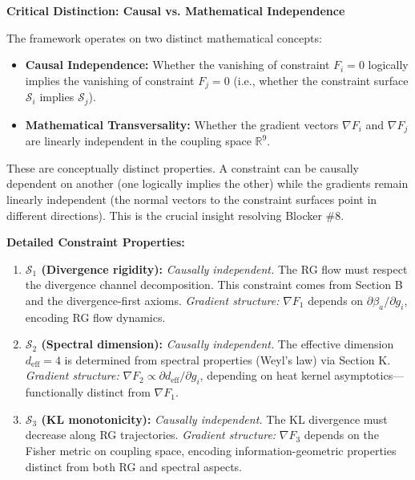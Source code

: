 {\begin{remark}
\textbf{Critical Distinction: Causal vs. Mathematical Independence}

The framework operates on two distinct mathematical concepts:

\begin{itemize}
\item \textbf{Causal Independence:} Whether the vanishing of constraint $F_i = 0$ logically implies the vanishing of constraint $F_j = 0$ (i.e., whether the constraint surface $\mathcal{S}_i$ implies $\mathcal{S}_j$).
\item \textbf{Mathematical Transversality:} Whether the gradient vectors $\nabla F_i$ and $\nabla F_j$ are linearly independent in the coupling space $\mathbb{R}^9$.
\end{itemize}

These are conceptually distinct properties. A constraint can be causally dependent on another (one logically implies the other) while the gradients remain linearly independent (the normal vectors to the constraint surfaces point in different directions). This is the crucial insight resolving Blocker \#8.

\textbf{Detailed Constraint Properties:}

\begin{enumerate}

\item \textbf{$\mathcal{S}_1$ (Divergence rigidity):} \textit{Causally independent.} The RG flow must respect the divergence channel decomposition. This constraint comes from Section B and the divergence-first axioms. \textit{Gradient structure:} $\nabla F_1$ depends on $\partial \beta_a / \partial g_i$, encoding RG flow dynamics.

\item \textbf{$\mathcal{S}_2$ (Spectral dimension):} \textit{Causally independent.} The effective dimension $d_{\text{eff}} = 4$ is determined from spectral properties (Weyl's law) via Section K. \textit{Gradient structure:} $\nabla F_2 \propto \partial d_{\text{eff}} / \partial g_i$, depending on heat kernel asymptotics---functionally distinct from $\nabla F_1$.

\item \textbf{$\mathcal{S}_3$ (KL monotonicity):} \textit{Causally independent.} The KL divergence must decrease along RG trajectories. \textit{Gradient structure:} $\nabla F_3$ depends on the Fisher metric on coupling space, encoding information-geometric properties distinct from both RG and spectral aspects.


\end{enumerate}
\end{remark}}
